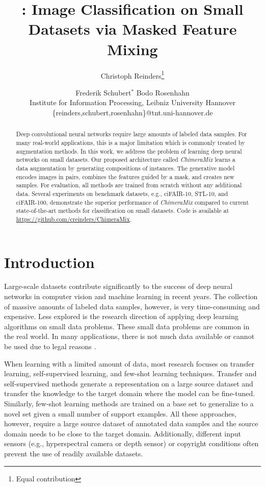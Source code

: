 \documentclass{article}
\title{\methodname: Image Classification on Small Datasets via Masked Feature Mixing}
\author{
Christoph Reinders\footnote{Equal contribution}\and
Frederik Schubert$^*$\And
Bodo Rosenhahn\\
\affiliations
Institute for Information Processing, Leibniz University Hannover
\emails
\{reinders,schubert,rosenhahn\}@tnt.uni-hannover.de
}
\newcommand{\methodname}{ChimeraMix\xspace}
\newcommand{\cifairX}{ciFAIR-10\xspace}
\newcommand{\cifairC}{ciFAIR-100\xspace}
\newcommand{\stl}{STL-10\xspace}
\begin{document}
\maketitle

\begin{abstract}
Deep convolutional neural networks require large amounts of labeled data samples. 
For many real-world applications, this is a major limitation which is commonly treated by augmentation methods. 
In this work, we address the problem of learning deep neural networks on small datasets. 
Our proposed architecture called \emph{\methodname} learns a data augmentation by generating compositions of instances. 
The generative model encodes images in pairs, combines the features guided by a mask, and creates new samples.
For evaluation, all methods are trained from scratch without any additional data.
Several experiments on benchmark datasets, e.g., \cifairX, \stl, and \cifairC, demonstrate the superior performance of \emph{\methodname} compared to current state-of-the-art methods for classification on small datasets. 
Code is available at \\\url{https://github.com/creinders/ChimeraMix}.
\end{abstract}

\section{Introduction}
\label{sec:introduction}

Large-scale datasets contribute significantly to the success of deep neural networks in computer vision and machine learning in recent years.
The collection of massive amounts of labeled data samples, however, is very time-consuming and expensive. 
Less explored is the research direction of applying deep learning algorithms on small data problems.
These small data problems are common in the real world.
In many applications, there is not much data available or cannot be used due to legal reasons \cite{renardVariabilityReproducibilityDeep2020}.

When learning with a limited amount of data, most research focuses on transfer learning, self-supervised learning, and few-shot learning techniques. 
Transfer \cite{neyshaburWhatBeingTransferred2020} and self-supervised methods \cite{assranSemiSupervisedLearningVisual2021} generate a representation on a large source dataset and transfer the knowledge to the target domain where the model can be fine-tuned. 
Similarly, few-shot learning methods \cite{kolesnikovBigTransferBiT2020} are trained on a base set to generalize to a novel set given a small number of support examples. 
All these approaches, however, require a large source dataset of annotated data samples and the source domain needs to be close to the target domain.
Additionally, different input sensors (e.g., hyperspectral camera or depth sensor) or copyright conditions often prevent the use of readily available datasets.
\end{document}
